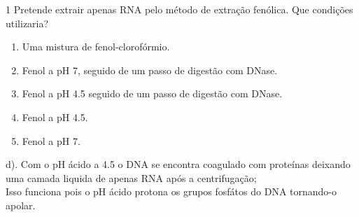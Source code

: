 \documentclass[\mainfilename]{subfiles}
\begin{document}
\begin{questionBox}1{ %
    Pretende extrair apenas RNA pelo método de extração fenólica. Que condições utilizaria?
} %
    \begin{enumerate}[label=\alph{enumi}.]
        \item Uma mistura de fenol-clorofórmio.
        \item Fenol a pH 7, seguido de um passo de digestão com DNase. 
        \item Fenol a pH 4.5 seguido de um passo de digestão com DNase. 
        \item Fenol a pH 4.5.
        \item Fenol a pH 7.
    \end{enumerate}

    \begin{answerBox}{} %
        d). Com o pH ácido a 4.5 o DNA se encontra coagulado com proteínas deixando uma camada liquida de apenas RNA após a centrifugação;\\

        Isso funciona pois o pH ácido protona os grupos fosfátos do DNA tornando-o apolar.
    \end{answerBox}

\end{questionBox}
\end{document}
